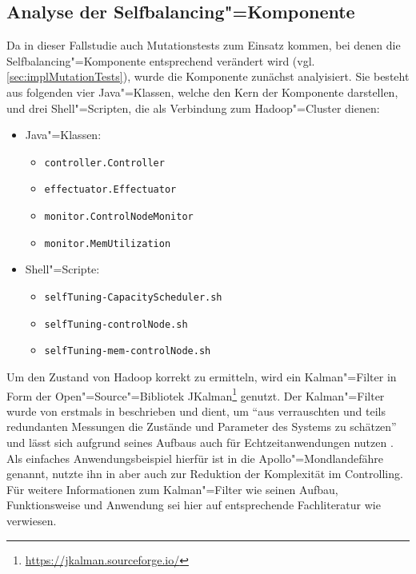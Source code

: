 \subsection{Analyse der Selfbalancing"=Komponente}
\label{sec:selfbalancingAnalysis}

Da in dieser Fallstudie auch Mutationstests zum Einsatz kommen, bei denen die Selfbalancing"=Komponente entsprechend verändert wird (vgl. \autoref{sec:implMutationTests}), wurde die Komponente zunächst analyisiert.
Sie besteht aus folgenden vier Java"=Klassen, welche den Kern der Komponente darstellen, und drei Shell"=Scripten, die als Verbindung zum Hadoop"=Cluster dienen:

\begin{itemize}
    \item Java"=Klassen:
    \begin{itemize}
        \item \texttt{controller.Controller}
        \item \texttt{effectuator.Effectuator}
        \item \texttt{monitor.ControlNodeMonitor}
        \item \texttt{monitor.MemUtilization}
    \end{itemize}
    \item Shell"=Scripte:
    \begin{itemize}
        \item \texttt{selfTuning-CapacityScheduler.sh}
        \item \texttt{selfTuning-controlNode.sh}
        \item \texttt{selfTuning-mem-controlNode.sh}
    \end{itemize}
\end{itemize}

Um den Zustand von Hadoop korrekt zu ermitteln, wird ein Kalman"=Filter in Form der Open"=Source"=Bibliotek JKalman\footnote{\url{https://jkalman.sourceforge.io/}} genutzt.
Der Kalman"=Filter wurde von \citeauthor{Kalman1960} erstmals in \cite{Kalman1960} beschrieben und dient, um \enquote{aus verrauschten und teils redundanten Messungen die Zustände und Parameter des Systems zu schätzen} und lässt sich aufgrund seines Aufbaus auch für Echtzeitanwendungen nutzen \cite{Marchthaler2017}.
Als einfaches Anwendungsbeispiel hierfür ist in \cite{Marchthaler2017} die Apollo"=Mondlandefähre genannt, \citeauthor{Strukov2001} nutzte ihn in \cite{Strukov2001} aber auch zur Reduktion der Komplexität im Controlling.
Für weitere Informationen zum Kalman"=Filter wie seinen Aufbau, Funktionsweise und Anwendung sei hier auf entsprechende Fachliteratur wie \zB \cite{Kim2016,Simon2006,Aggoun2004} verwiesen.

